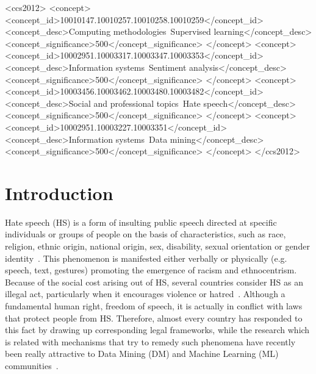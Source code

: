 \documentclass[sigconf]{acmart}
\begin{document}
\begin{CCSXML}
<ccs2012>
<concept>
<concept_id>10010147.10010257.10010258.10010259</concept_id>
<concept_desc>Computing methodologies~Supervised learning</concept_desc>
<concept_significance>500</concept_significance>
</concept>
<concept>
<concept_id>10002951.10003317.10003347.10003353</concept_id>
<concept_desc>Information systems~Sentiment analysis</concept_desc>
<concept_significance>500</concept_significance>
</concept>
<concept>
<concept_id>10003456.10003462.10003480.10003482</concept_id>
<concept_desc>Social and professional topics~Hate speech</concept_desc>
<concept_significance>500</concept_significance>
</concept>
<concept>
<concept_id>10002951.10003227.10003351</concept_id>
<concept_desc>Information systems~Data mining</concept_desc>
<concept_significance>500</concept_significance>
</concept>
</ccs2012>
\end{CCSXML}





\maketitle

\section{Introduction}
Hate speech (HS) is a form of insulting public speech directed at specific individuals or groups of people on the basis of characteristics, such as race, religion, ethnic origin, national origin, sex, disability, sexual orientation or gender identity~\cite{wikiHate}. This phenomenon is manifested either verbally or physically (e.g.  speech, text, gestures) promoting the emergence of racism and ethnocentrism. Because of the social cost arising out of HS, several countries consider HS as an illegal act, particularly when it encourages violence or hatred~\cite{euCHS,canadaHS}. Although a fundamental human right, freedom of speech, it is actually in conflict with laws that protect people from HS. Therefore, almost every country has responded to this fact by drawing up corresponding legal frameworks, while the research which is related with mechanisms that try to remedy such phenomena have recently been really attractive to Data Mining (DM) and Machine Learning (ML) communities~\cite{DBLP:journals/ethicsit/UllmannT20}.
\end{document}
